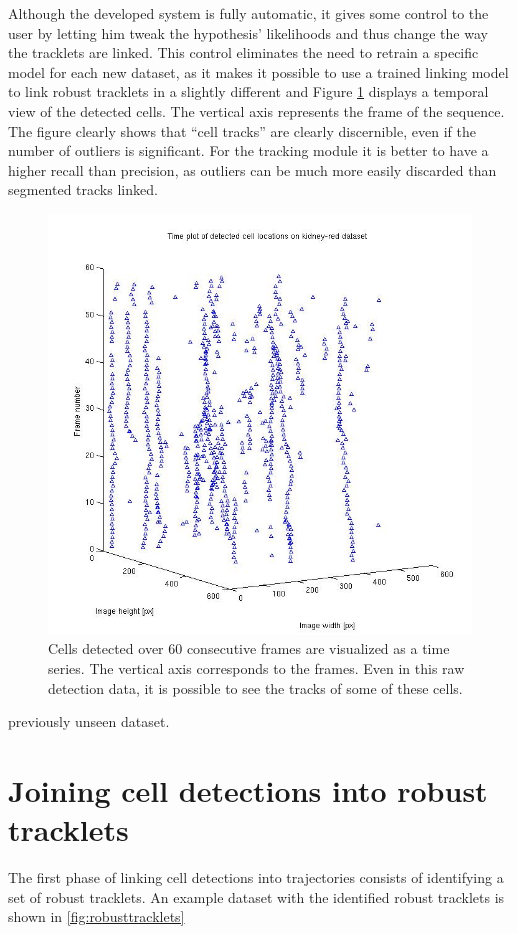 		Although the developed system is fully automatic, it gives some control to the user by letting him tweak the hypothesis' likelihoods and thus change the way the tracklets are linked. This control eliminates the need to retrain a specific model for each new dataset, as it makes it possible to use a trained linking model to link robust tracklets in a slightly different and	Figure \ref{fig:cell_tracks_detection} displays a temporal view of the detected cells. The vertical axis represents the frame of the sequence. The figure clearly shows that ``cell tracks'' are clearly discernible, even if the number of outliers is significant. For the tracking module it is better to have a higher recall than precision, as outliers can be much more easily discarded than segmented tracks linked.
			\begin{figure}
				\includegraphics[width=\textwidth]{images/cell_tracks}
					\caption{Cells detected over 60 consecutive frames are visualized as a time series. The vertical axis corresponds to the frames. Even in this raw detection data, it is possible to see the tracks of some of these cells.}
				\label{fig:cell_tracks_detection}
			\end{figure} previously unseen dataset.
	
	\section{Joining cell detections into robust tracklets \statusfirstdraft}
		\label{sec:tracking_robusttracklets}
		The first phase of linking cell detections into trajectories consists of identifying a set of robust tracklets. An example dataset with the identified robust tracklets is shown in \cref{fig:robusttracklets}
		

